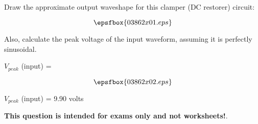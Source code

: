 

Draw the approximate output waveshape for this clamper (DC restorer) circuit:

$$\epsfbox{03862x01.eps}$$

Also, calculate the peak voltage of the input waveform, assuming it is perfectly sinusoidal.

\vskip 5pt

$V_{peak}$ (input) = 







$$\epsfbox{03862x02.eps}$$

$V_{peak}$ (input) = 9.90 volts







{\bf This question is intended for exams only and not worksheets!}.



